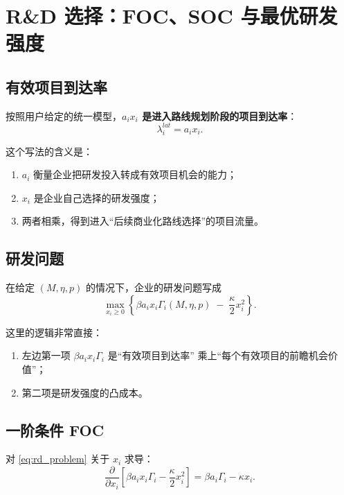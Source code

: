 \documentclass[12pt,UTF8]{ctexart}
\theoremstyle{plain}
\theoremstyle{remark}
\begin{document}
\section{R\&D 选择：FOC、SOC 与最优研发强度}

\subsection{有效项目到达率}

按照用户给定的统一模型，\textbf{$a_i x_i$ 是进入路线规划阶段的项目到达率}：
\begin{equation}
\lambda_i^{lat}=a_i x_i.
\label{eq:latent_arrival}
\end{equation}

这个写法的含义是：

\begin{enumerate}[leftmargin=2em]
    \item $a_i$ 衡量企业把研发投入转成有效项目机会的能力；
    \item $x_i$ 是企业自己选择的研发强度；
    \item 两者相乘，得到进入“后续商业化路线选择”的项目流量。
\end{enumerate}

\subsection{研发问题}

在给定 $(M,\eta,p)$ 的情况下，企业的研发问题写成
\begin{equation}
\max_{x_i\ge 0}
\left\{
\beta a_i x_i \Gamma_i(M,\eta,p)
\;-\;
\frac{\kappa}{2}x_i^2
\right\}.
\label{eq:rd_problem}
\end{equation}

这里的逻辑非常直接：

\begin{enumerate}[leftmargin=2em]
    \item 左边第一项 $\beta a_i x_i \Gamma_i$ 是“有效项目到达率”
    乘上“每个有效项目的前瞻机会价值”；
    \item 第二项是研发强度的凸成本。
\end{enumerate}

\subsection{一阶条件 FOC}

对 \eqref{eq:rd_problem} 关于 $x_i$ 求导：
\begin{equation}
\frac{\partial}{\partial x_i}
\left[
\beta a_i x_i \Gamma_i
-\frac{\kappa}{2}x_i^2
\right]
=
\beta a_i\Gamma_i - \kappa x_i.
\label{eq:foc_step}
\end{equation}
\end{document}
